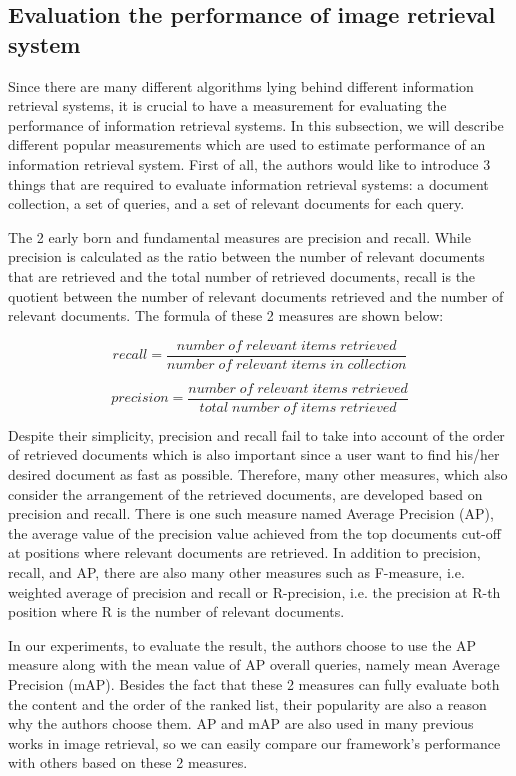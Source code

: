 \subsection{Evaluation the performance of image retrieval system} \label{section:evaluation_ir_sys}

Since there are many different algorithms lying behind different information retrieval systems, it is crucial to have a measurement for evaluating the performance of information retrieval systems. In this subsection, we will describe different popular measurements which are used to estimate performance of an information retrieval system. First of all, the authors would like to introduce 3 things that are required to evaluate information retrieval systems: a document collection, a set of queries, and a set of relevant documents for each query.

The 2 early born and fundamental measures are precision and recall. While precision is calculated as the ratio between the number of relevant documents that are retrieved and the total number of retrieved documents, recall is the quotient between the number of relevant documents retrieved and the number of relevant documents. The formula of these 2 measures are shown below:

\begin{equation}
recall = \frac{number\;of\;relevant\;items\;retrieved}{number\;of\;relevant\;items\;in\;collection}
\end{equation}

\begin{equation}
precision = \frac{number\;of\;relevant\;items\;retrieved}{total\;number\;of\;items\;retrieved}
\end{equation}

Despite their simplicity, precision and recall fail to take into account of the order of retrieved documents which is also important since a user want to find his/her desired document as fast as possible. Therefore, many other measures, which also consider the arrangement of the retrieved documents, are developed based on precision and recall. There is one such measure named Average Precision (AP), the average value of the precision value achieved from the top documents cut-off at positions where relevant documents are retrieved. In addition to precision, recall, and AP, there are also many other measures such as F-measure, i.e. weighted average of precision and recall or R-precision, i.e. the precision at R-th position where R is the number of relevant documents.

In our experiments, to evaluate the result, the authors choose to use the AP measure along with the mean value of AP overall queries, namely mean Average Precision (mAP). Besides the fact that these 2 measures can fully evaluate both the content and the order of the ranked list, their popularity are also a reason why the authors choose them. AP and mAP are also used in many previous works in image retrieval, so we can easily compare our framework's performance with others based on these 2 measures.
